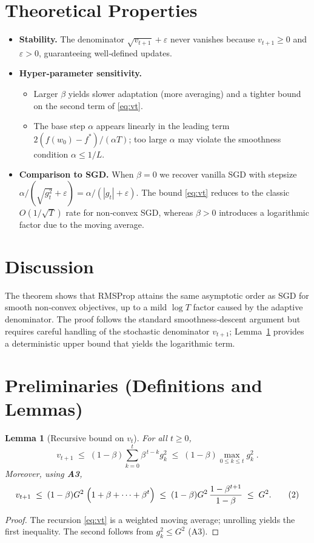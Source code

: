 \documentclass[11pt]{article}
\newtheorem{lemma}{Lemma}
\begin{document}
\section*{Theoretical Properties}
\begin{itemize}
\item \textbf{Stability.} The denominator $\sqrt{v_{t+1}}+\varepsilon$ never vanishes because $v_{t+1}\ge0$ and $\varepsilon>0$, guaranteeing well‑defined updates.
\item \textbf{Hyper‑parameter sensitivity.}
    \begin{itemize}
        \item Larger $\beta$ yields slower adaptation (more averaging) and a tighter bound on the second term of \eqref{eq:vt}.
        \item The base step $\alpha$ appears linearly in the leading term $2(f(w_0)-f^{*})/(\alpha T)$; too large $\alpha$ may violate the smoothness condition $\alpha\le1/L$.
    \end{itemize}
\item \textbf{Comparison to SGD.} When $\beta=0$ we recover vanilla SGD with stepsize $\alpha/(\sqrt{g_t^{2}}+\varepsilon)=\alpha/(|g_t|+\varepsilon)$. The bound \eqref{eq:vt} reduces to the classic $O(1/\sqrt{T})$ rate for non‑convex SGD, whereas $\beta>0$ introduces a logarithmic factor due to the moving average.
\end{itemize}

\section*{Discussion}
The theorem shows that RMSProp attains the same asymptotic order as SGD for smooth non‑convex objectives, up to a mild $\log T$ factor caused by the adaptive denominator. The proof follows the standard smoothness‑descent argument but requires careful handling of the stochastic denominator $v_{t+1}$; Lemma~\ref{lem:vtbound} provides a deterministic upper bound that yields the logarithmic term.

\newpage
\section*{Preliminaries (Definitions and Lemmas)}
\begin{lemma}[Recursive bound on $v_t$]\label{lem:vtbound}
For all $t\ge0$,
\[
v_{t+1}\;\le\;(1-\beta) \sum_{k=0}^{t}\beta^{\,t-k} g_k^{2}\;\le\;(1-\beta)\max_{0\le k\le t} g_k^{2}\;.
\]
Moreover, using \textbf{A3},
\[
v_{t+1}\;\le\;(1-\beta)G^{2}\;\Bigl(1+\beta+\dots+\beta^{t}\Bigr)
\;\le\;(1-\beta)G^{2}\,\frac{1-\beta^{t+1}}{1-\beta}
\;\le\;G^{2}. \tag{2}
\]
\end{lemma}
\begin{proof}
The recursion \eqref{eq:vt} is a weighted moving average; unrolling yields the first inequality. The second follows from $g_k^{2}\le G^{2}$ (A3). \qedhere
\end{proof}
\end{document}
